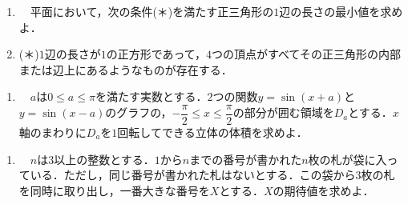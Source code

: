 \documentclass[a4paper]{ltjsarticle}
\begin{document}
\newpage\noindent
\begin{enumerate}
        \begin{enumerate}
        \item[] 　平面において，\;次の条件(＊)を満たす正三角形の$1$辺の長さの最小値を求めよ．
        \item[] \;(＊)\;$1$辺の長さが$1$の正方形であって，$4$つの頂点がすべてその正三角形の内部または辺上にあるようなものが存在する．
        \end{enumerate}
\end{enumerate}\vspace{10truemm}

\begin{enumerate}
        \begin{enumerate}
        \item[] 　$a$は$0\le{a}\le\pi$を満たす実数とする．$2$つの関数$y=\sin(x+a)$と$y=\sin(x-a)$のグラフの，$-\dfrac{\pi}{2}\leq{x}\leq\dfrac{\pi}{2}$の部分が囲む領域を$D_a$とする．$x$軸のまわりに$D_a$を$1$回転してできる立体の体積を求めよ．
        \end{enumerate}
\end{enumerate}\vspace{10truemm}

\begin{enumerate}
        \begin{enumerate}
        \item[] 　$n$は$3$以上の整数とする．$1$から$n$までの番号が書かれた$n$枚の札が袋に入っている．ただし，同じ番号が書かれた札はないとする．この袋から$3$枚の札を同時に取り出し，一番大きな番号を$X$とする．$X$の期待値を求めよ．
        \end{enumerate}
\end{enumerate}\vspace{10truemm}

\vfill
\hspace{1.5cm}\\[-4mm]
\end{document}
